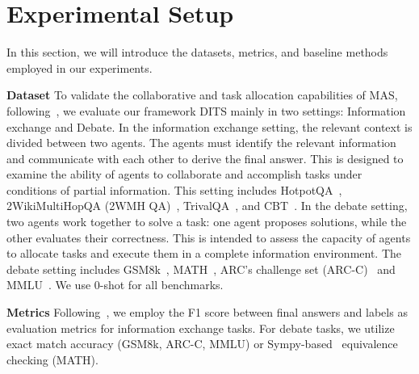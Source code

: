 \section{Experimental Setup}
\label{section:setup}

In this section, we will introduce the datasets, metrics, and baseline methods employed in our experiments.

\textbf{Dataset}
To validate the collaborative and task allocation capabilities of MAS, following~\citet{DBLP:journals/corr/abs-2410-08115}, 
we evaluate our framework DITS mainly in two settings: Information exchange and Debate. In the information exchange setting, the relevant context is divided between two agents. The agents must identify the relevant information and communicate with each other to derive the final answer. This is designed to examine the ability of agents to collaborate and accomplish tasks under conditions of partial information. This setting includes HotpotQA~\cite{DBLP:conf/emnlp/Yang0ZBCSM18}, 2WikiMultiHopQA (2WMH QA)~\cite{DBLP:conf/coling/HoNSA20}, TrivalQA~\cite{DBLP:conf/acl/JoshiCWZ17}, and CBT~\cite{DBLP:journals/corr/HillBCW15}. In the debate setting, two agents work together to solve a task: one agent proposes solutions, while the other evaluates their correctness. 
This is intended to assess the capacity of agents to allocate tasks and execute them in a complete information environment. The debate setting includes GSM8k~\cite{DBLP:journals/corr/abs-2110-14168}, MATH~\cite{DBLP:conf/nips/HendrycksBKABTS21}, ARC's challenge set (ARC-C)~\cite{DBLP:journals/corr/abs-2102-03315} and MMLU~\cite{DBLP:conf/iclr/HendrycksBBZMSS21}. We use 0-shot for all benchmarks.




\textbf{Metrics}
Following~\citet{DBLP:journals/corr/abs-2410-08115}, we employ the F1 score between final answers and labels as evaluation metrics for information exchange tasks. For debate tasks, we utilize exact match accuracy (GSM8k, ARC-C, MMLU) or Sympy-based~\cite{DBLP:journals/peerj-cs/MeurerSPCKRKIMS17} equivalence checking (MATH). 

